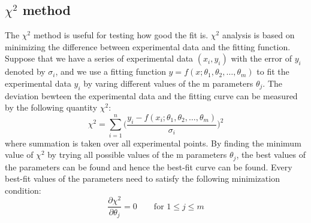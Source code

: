 \documentclass[12pt,a4paper]{report}
\begin{document}
\subsection{$\chi^2$ method}
The $\chi^2$ method is useful for testing how good the fit is.
$\chi^2$ analysis \cite{stat_2, BAKER1984437, reduced_chi_squared} is based on minimizing the difference between experimental data and the fitting function. Suppose that we have a series of experimental data $(x_i,y_i)$ with the error of $y_i$ denoted by $\sigma_i$, and we use a fitting function $y = f(x;\theta_1,\theta_2,\dots,\theta_m)$ to fit the experimental data $y_i$ by varing different values of the m parameters $\theta_j$. The deviation bewteen the experimental data and the fitting curve can be measured by the following quantity $\chi^2$:
\begin{equation} \label{chi_square_formula}
\chi^2 = \sum_{i = 1}^{n} \Big ( \frac{y_i - f(x_i;\theta_1,\theta_2,\dots,\theta_m)}{\sigma_i} \Big )^2
\end{equation}
where summation is taken over all experimental points.
By finding the minimum value of $\chi^2$ by trying all possible values of the m parameters $\theta_j$, the best values of the parameters can be found and hence the best-fit curve can be found.
Every best-fit values of the parameters need to satisfy the following minimization condition:
\begin{equation} \label{chi_minimisation_condition}
\frac{\partial \chi^2}{\partial \theta_j} = 0 \qquad \text{for } 1 \leq  j \leq m
\end{equation}
\end{document}
